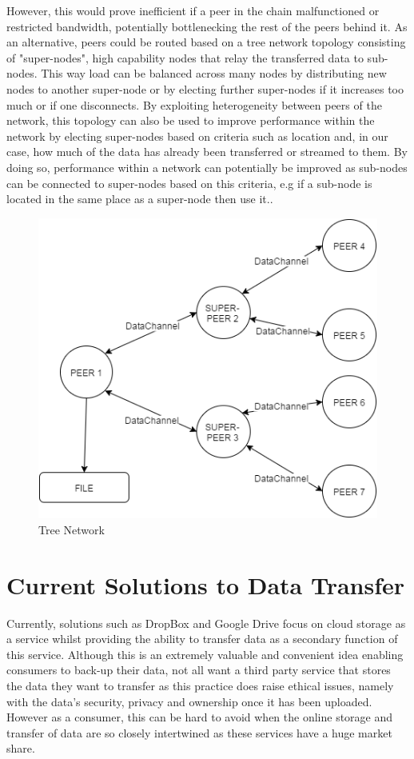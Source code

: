 \documentclass[]{report}
\begin{document}
	However, this would prove inefficient if a peer in the chain malfunctioned or restricted bandwidth, potentially bottlenecking the rest of the peers behind it. As an alternative, peers could be routed based on a tree network topology \cite{Tree Topology} consisting of "super-nodes", high capability nodes that relay the transferred data to sub-nodes. This way load can be balanced across many nodes by distributing new nodes to another super-node or by electing further super-nodes if it increases too much or if one disconnects. By exploiting heterogeneity between peers of the network, this topology can also be used to improve performance within the network by electing super-nodes based on criteria such as location and, in our case, how much of the data has already been transferred or streamed to them. By doing so, performance within a network can potentially be improved as sub-nodes can be connected to super-nodes based on this criteria, e.g if a sub-node is located in the same place as a super-node then use it.\cite{Supernodes}.		
	\begin{figure}[H]
		\centering
		\caption{Tree Network}
		\includegraphics[scale=0.4]{treetopology.png}
	\end{figure}			
	
\section{Current Solutions to Data Transfer}
	Currently, solutions such as DropBox and Google Drive focus on cloud storage as a service whilst providing the ability to transfer data as a secondary function of this service. Although this is an extremely valuable and convenient idea enabling consumers to back-up their data, not all want a third party service that stores the data they want to transfer as this practice does raise ethical issues, namely with the data's security, privacy and ownership once it has been uploaded. However as a consumer, this can be hard to avoid when the online storage and transfer of data are so closely intertwined as these services have a huge market share.
	
\end{document}

